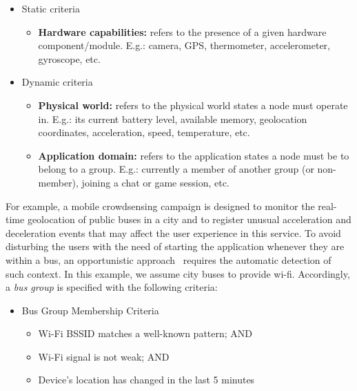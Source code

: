 \begin{itemize}
	
	\item Static criteria
	
	\begin{itemize}
		
		\item \textbf{Hardware capabilities:} refers to the presence of a given hardware component/module. E.g.: camera, GPS, thermometer, accelerometer, gyroscope, etc.
		
	\end{itemize}
	
	\item Dynamic criteria
	
	\begin{itemize}
		
		\item \textbf{Physical world:} refers to the physical world states a node must operate in. E.g.: its current battery level, available memory, geolocation coordinates, acceleration, speed, temperature, etc.
		
		\item \textbf{Application domain:} refers to the application states a node must be to belong to a group. E.g.: currently a member of another group (or non-member), joining a chat or game session, etc.
		
	\end{itemize}
	
\end{itemize}

For example, a mobile crowdsensing campaign is designed to monitor the real-time geolocation of public buses in a city and to register unusual acceleration and deceleration events that may affect the user experience in this service. To avoid disturbing the users with the need of starting the application whenever they are within a bus, an opportunistic approach~\cite{} requires the automatic detection of such context. In this example, we assume city buses to provide wi-fi. Accordingly, a \textit{bus group} is specified with the following criteria:

\begin{itemize}
	
	\item Bus Group Membership Criteria
	
	\begin{itemize}
		
		\item Wi-Fi BSSID matches a well-known pattern; AND
		
		\item Wi-Fi signal is not weak; AND
		
		\item Device's location has changed in the last 5 minutes
		
	\end{itemize}
	
\end{itemize}

